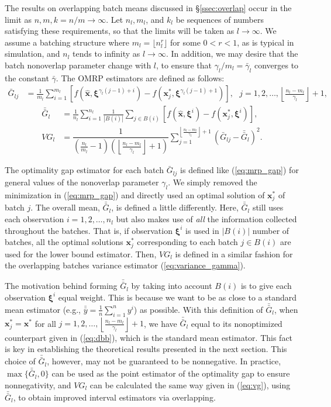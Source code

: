 \documentclass[12pt]{article}
\newcommand{\x}{\mathbf{x}}
\newcommand{\xh}{{\hat{\x}}}
\newcommand{\xs}{\x^*}
\newcommand{\xit}{\boldsymbol{\xi}}
\newcommand{\xiti}{\xit^i}
\newcommand{\nbl}{\left\lfloor\tfrac{n_l-m_l}{\gamma_l}\right\rfloor+1}
\newcommand{\gammab}{\bar{\gamma}}
\newcommand{\gb}{\bar{G}}
\newcommand{\gbb}{\bar{\gb}}
\newcommand{\yb}{\bar{y}}
\newcommand{\ybb}{\bar{\yb}}
\begin{document}
The results on overlapping batch means discussed in \S \ref{ssec:overlap} occur in the limit as $n, m, k=n/m \rightarrow \infty$.  
Let $n_l, m_l$, and $k_l$ be sequences of numbers satisfying these requirements, so that the limits will be taken as $l \rightarrow \infty$.  
We assume a batching structure where $m_l = \lfloor n_l ^r \rfloor$ for some $0<r<1$, as is typical in simulation, and $n_l$ tends to infinity as $l \rightarrow \infty$.  
In addition, we may desire that the batch nonoverlap parameter change with $l$, to ensure that $\gamma_l / m_l = \gammab_l$ converges to the constant $\gammab$.  
The OMRP estimators are defined as follows:
\begin{align}
	\gb_{lj} & = \frac{1}{m_l} \sum_{i=1}^{m_l} \left[ f(\xh,\xit^{\gamma_l(j-1)+i}) - f(\xs_j,\xit^{\gamma_l(j-1)+1}) \right],\ \ \ j = 1, 2, \dots, \nbl, \label{eq:gbar} 
\end{align}
\begin{align}
	\gbb_l & = \frac{1}{n_l} \sum_{i=1}^{n_l} \frac{1}{|B(i)|} \sum_{j \in B(i)} \left[ f(\xh,\xiti) - f(\xs_j,\xiti) \right], \label{eq:gbb} \\
	VG_l & = \dfrac{1}{\left( \tfrac{n_l}{m_l} - 1 \right) \left(\nbl\right)} \sum_{j=1}^{\nbl} (\gb_{lj} - \gbb_l)^2. \label{eq:vg}
\end{align}

The optimality gap estimator for each batch $\gb_{lj}$ is defined like (\ref{eq:mrp_gap}) for general values of the nonoverlap parameter $\gamma_l$.  
We simply removed the minimization in (\ref{eq:mrp_gap}) and directly used an optimal solution of $\xs_j$ of batch $j$.  
The overall mean, $\gbb_l$, is defined a little differently.  
Here, $\gbb_l$ still uses each observation $i = 1, 2, \dots, n_l$ but also makes use of {\it all} the information collected throughout the batches.  
That is, if observation $\xiti$ is used in $|B(i)|$ number of batches, all the optimal solutions $\xs_j$ corresponding to each batch $j \in B(i)$ are used for the lower bound estimator.  
Then, $VG_l$ is defined in a similar fashion for the overlapping batches variance estimator (\ref{eq:variance_gamma}).

The motivation behind forming $\gbb_l$ by taking into account $B(i)$ is to give each observation $\xit^i$ equal weight. 
This is because we want to be as close to a standard mean estimator (e.g., $\ybb=\frac{1}{n}\sum_{i=1}^{n} y^i$) as possible.
With this definition of $\gbb_l$, when $\xs_j= \xs$ for all $j= 1, 2, \dots, \nbl$, we have $\gbb_l$ equal to its nonoptimized counterpart given in (\ref{eq:dbb}), which is the standard mean estimator. 
This fact is key in establishing the theoretical results presented in the next section. 
This choice of $\gbb_l$, however, may not be guaranteed to be nonnegative.
In practice, $\max\{\gbb_l,0\}$ can be used as the point estimator of the optimality gap to ensure nonnegativity, and $VG_l$ can be calculated the same way given in (\ref{eq:vg}), using $\gbb_l$, to obtain improved interval estimators via overlapping. 
\end{document}
